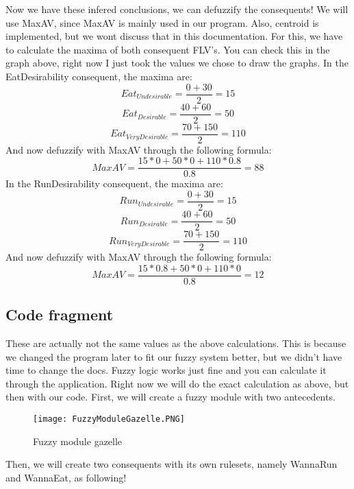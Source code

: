 Now we have these infered conclusions, we can defuzzify the consequents!
We will use MaxAV, since MaxAV is mainly used in our program.
Also, centroid is implemented, but we wont discuss that in this documentation.
For this, we have to calculate the maxima of both consequent FLV's.
You can check this in the graph above, right now I just took the values we chose to draw the graphs.
In the EatDesirability consequent, the maxima are:
\begin{equation}
    Eat_{Undesirable} = \frac{0 + 30}2 = 15
\end{equation}
\begin{equation}
    Eat_{Desirable} = \frac{40 + 60}2 = 50
\end{equation}
\begin{equation}
    Eat_{VeryDesirable} = \frac{70 + 150}2 = 110
\end{equation}
And now defuzzify with MaxAV through the following formula:
\begin{equation}
    MaxAV = \frac{15 * 0 + 50 * 0 + 110 * 0.8}{0.8} = 88
\end{equation}
In the RunDesirability consequent, the maxima are:
\begin{equation}
    Run_{Undesirable} = \frac{0 + 30}2 = 15
\end{equation}
\begin{equation}
    Run_{Desirable} = \frac{40 + 60}2 = 50
\end{equation}
\begin{equation}
    Run_{VeryDesirable} = \frac{70 + 150}2 = 110
\end{equation}
And now defuzzify with MaxAV through the following formula:
\begin{equation}
    MaxAV = \frac{15 * 0.8 + 50 * 0 + 110 * 0}{0.8} = 12
\end{equation}

\newpage
\subsection{Code fragment}
These are actually not the same values as the above calculations.
This is because we changed the program later to fit our fuzzy system better, but we didn't have time to change the docs.
Fuzzy logic works just fine and you can calculate it through the application.
Right now we will do the exact calculation as above, but then with our code.
First, we will create a fuzzy module with two antecedents.

\begin{figure}[ht]
    \begin{center}
        \texttt{[image: FuzzyModuleGazelle.PNG]}
    \end{center}
    \caption{Fuzzy module gazelle}
    \label{fig:FuzzyModuleGazelle}
\end{figure}
\newpage
Then, we will create two consequents with its own rulesets, namely WannaRun and WannaEat, as following!

